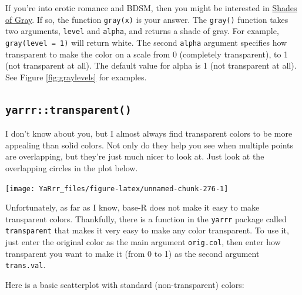 \documentclass[]{book}
\newenvironment{Shaded}{\begin{snugshade}}{\end{snugshade}}
\newcommand{\KeywordTok}[1]{\textcolor[rgb]{0.13,0.29,0.53}{\textbf{#1}}}
\newcommand{\DataTypeTok}[1]{\textcolor[rgb]{0.13,0.29,0.53}{#1}}
\newcommand{\DecValTok}[1]{\textcolor[rgb]{0.00,0.00,0.81}{#1}}
\newcommand{\StringTok}[1]{\textcolor[rgb]{0.31,0.60,0.02}{#1}}
\newcommand{\CommentTok}[1]{\textcolor[rgb]{0.56,0.35,0.01}{\textit{#1}}}
\newcommand{\OperatorTok}[1]{\textcolor[rgb]{0.81,0.36,0.00}{\textbf{#1}}}
\newcommand{\NormalTok}[1]{#1}
\theoremstyle{definition}
\theoremstyle{definition}
\theoremstyle{remark}
\begin{document}
If you're into erotic romance and BDSM, then you might be interested in
\href{https://en.wikipedia.org/wiki/Fifty_Shades_of_Grey}{Shades of
Gray}. If so, the function \texttt{gray(x)} is your answer. The
\texttt{gray()} function takes two arguments, \texttt{level} and
\texttt{alpha}, and returns a shade of gray. For example,
\texttt{gray(level\ =\ 1)} will return white. The second \texttt{alpha}
argument specifies how transparent to make the color on a scale from 0
(completely transparent), to 1 (not transparent at all). The default
value for alpha is 1 (not transparent at all). See Figure
\ref{fig:graylevels} for examples.

\subsection{\texorpdfstring{\texttt{yarrr::transparent()}}{yarrr::transparent()}}\label{yarrrtransparent}

I don't know about you, but I almost always find transparent colors to
be more appealing than solid colors. Not only do they help you see when
multiple points are overlapping, but they're just much nicer to look at.
Just look at the overlapping circles in the plot below.

\begin{center}\texttt{[image: YaRrr\_files/figure-latex/unnamed-chunk-276-1]} \end{center}

Unfortunately, as far as I know, base-R does not make it easy to make
transparent colors. Thankfully, there is a function in the
\texttt{yarrr} package called \texttt{transparent} that makes it very
easy to make any color transparent. To use it, just enter the original
color as the main argument \texttt{orig.col}, then enter how transparent
you want to make it (from 0 to 1) as the second argument
\texttt{trans.val}.

Here is a basic scatterplot with standard (non-transparent) colors:

\begin{Shaded}
\end{Shaded}
\end{document}
